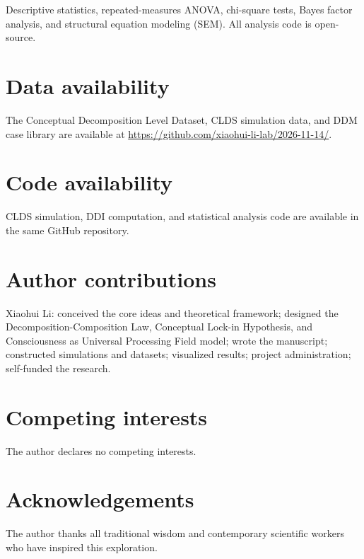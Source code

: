\documentclass[11pt,a4paper]{article}
\begin{document}
Descriptive statistics, repeated-measures ANOVA, chi-square tests, Bayes factor analysis, and structural equation modeling (SEM). All analysis code is open-source.

\section*{Data availability}

The Conceptual Decomposition Level Dataset, CLDS simulation data, and DDM case library are available at \url{https://github.com/xiaohui-li-lab/2026-11-14/}.

\section*{Code availability}

CLDS simulation, DDI computation, and statistical analysis code are available in the same GitHub repository.

\section*{Author contributions}

Xiaohui Li: conceived the core ideas and theoretical framework; designed the Decomposition-Composition Law, Conceptual Lock-in Hypothesis, and Consciousness as Universal Processing Field model; wrote the manuscript; constructed simulations and datasets; visualized results; project administration; self-funded the research.

\section*{Competing interests}

The author declares no competing interests.

\section*{Acknowledgements}

The author thanks all traditional wisdom and contemporary scientific workers who have inspired this exploration.
\end{document}
